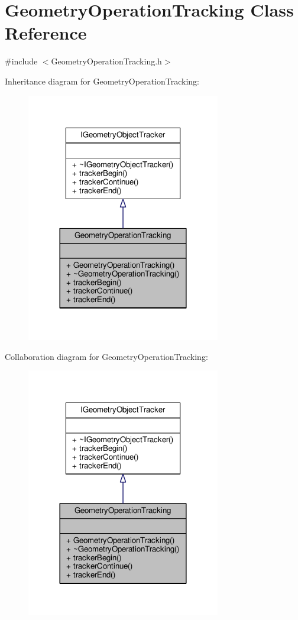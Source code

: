 \hypertarget{class_geometry_operation_tracking}{\section{Geometry\-Operation\-Tracking Class Reference}
\label{class_geometry_operation_tracking}
}


{\ttfamily \#include $<$Geometry\-Operation\-Tracking.\-h$>$}



Inheritance diagram for Geometry\-Operation\-Tracking\-:\nopagebreak
\begin{figure}[H]
\begin{center}
\leavevmode
\includegraphics[width=240pt]{class_geometry_operation_tracking__inherit__graph}
\end{center}
\end{figure}


Collaboration diagram for Geometry\-Operation\-Tracking\-:
\nopagebreak
\begin{figure}[H]
\begin{center}
\leavevmode
\includegraphics[width=240pt]{class_geometry_operation_tracking__coll__graph}
\end{center}
\end{figure}
